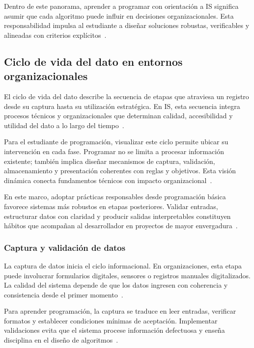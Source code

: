 \documentclass[12pt,twoside]{book}
\begin{document}
						Dentro de este panorama, aprender a programar con orientación a IS significa asumir que cada algoritmo puede influir en decisiones organizacionales. Esta responsabilidad impulsa al estudiante a diseñar soluciones robustas, verificables y alineadas con criterios explícitos~\cite{Leidig2021Competency,Leidig2020Updating,Laudon2020Management}.
						
				\subsection{Ciclo de vida del dato en entornos organizacionales}
					\noindent
					El ciclo de vida del dato describe la secuencia de etapas que atraviesa un registro desde su captura hasta su utilización estratégica. En IS, esta secuencia integra procesos técnicos y organizacionales que determinan calidad, accesibilidad y utilidad del dato a lo largo del tiempo~\cite{Laudon2020Management,Elmasri2016Database,Silberschatz2020Database}.
					
					Para el estudiante de programación, visualizar este ciclo permite ubicar su intervención en cada fase. Programar no se limita a procesar información existente; también implica diseñar mecanismos de captura, validación, almacenamiento y presentación coherentes con reglas y objetivos. Esta visión dinámica conecta fundamentos técnicos con impacto organizacional~\cite{Kendall2014Systems,Gaddis2022Starting,Tegarden2025Systems}.
					
					En este marco, adoptar prácticas responsables desde programación básica favorece sistemas más robustos en etapas posteriores. Validar entradas, estructurar datos con claridad y producir salidas interpretables constituyen hábitos que acompañan al desarrollador en proyectos de mayor envergadura~\cite{Ghezzi2003Fundamentals,Sommerville2015Software,ISO247722024Programming}.
					
					\subsubsection{Captura y validación de datos}
						\noindent
						La captura de datos inicia el ciclo informacional. En organizaciones, esta etapa puede involucrar formularios digitales, sensores o registros manuales digitalizados. La calidad del sistema depende de que los datos ingresen con coherencia y consistencia desde el primer momento~\cite{Laudon2020Management,Date2019Database,Elmasri2016Database}.
						
						Para aprender programación, la captura se traduce en leer entradas, verificar formatos y establecer condiciones mínimas de aceptación. Implementar validaciones evita que el sistema procese información defectuosa y enseña disciplina en el diseño de algoritmos~\cite{Gaddis2022Starting,Hanly2015Problem,ISO247722024Programming}.
						
\end{document}
